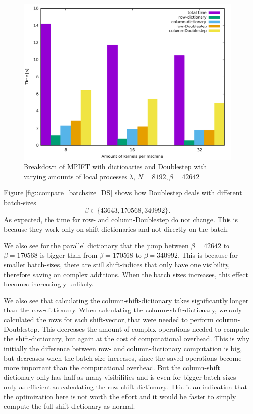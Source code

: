 \documentclass[12pt]{article}
\begin{document}
\begin{figure}[H]
	\includegraphics[width=380pt]{Doublestep_different_amount_of_kernels}
	\caption{Breakdown of MPIFT with dictionaries and Doublestep with varying amounts of local processes $\lambda$, $N=8192, \beta=42642$}
	\label{fig::compare_kernels_DS}
\end{figure}

Figure \ref{fig::compare_batchsize_DS} shows how Doublestep deals with different batch-sizes
\[
\beta \in \{43643,170568,340992\}.
\]
 As expected, the time for row- and column-Doublestep do not change. This is because they work only on shift-dictionaries and not directly on the batch.

We also see for the parallel dictionary that the jump between $\beta = 42642$ to $\beta=170568$ is bigger than from $\beta=170568$ to $\beta=340992$. This is because for smaller batch-sizes, there are still shift-indices that only have one visibility, therefore saving on complex additions. When the batch sizes increases, this effect becomes increasingly unlikely.

We also see that calculating the column-shift-dictionary takes significantly longer than the row-dictionary. When calculating the column-shift-dictionary, we only calculated the rows for each shift-vector, that were needed to perform column-Doublestep. This decreases the amount of complex operations needed to compute the shift-dictionary, but again at the cost of computational overhead. This is why initially the difference between row- and column-dictionary computation is big, but decreases when the batch-size increases, since the saved operations become more important than the computational overhead. But the column-shift dictionary only has half as many visibilities and is even for bigger batch-sizes only as efficient as calculating the row-shift dictionary. This is an indication that the optimization here is not worth the effort and it would be faster to simply compute the full shift-dictionary as normal.
\end{document}
